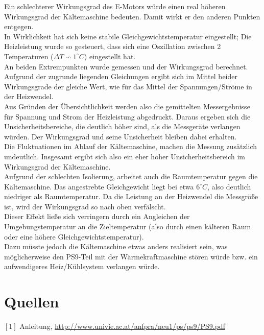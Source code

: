 \documentclass[12pt,a4paper]{article}
\begin{document}
\begin{multicols}{2}
\noindent Ein schlechterer Wirkungsgrad des E-Motors würde einen real höheren Wirkungsgrad der Kältemaschine bedeuten. Damit wirkt er den anderen Punkten entgegen.\\
In Wirklichkeit hat sich keine stabile Gleichgewichtstemperatur eingestellt; Die Heizleistung wurde so gesteuert, dass sich eine Oszillation zwischen 2 Temperaturen ($\Delta T \backsim 1^\circ C$) eingestellt hat.\\
An beiden Extrempunkten wurde gemessen und der Wirkungsgrad berechnet. Aufgrund der zugrunde liegenden Gleichungen ergibt sich im Mittel beider Wirkungsgrade der gleiche Wert, wie für das Mittel der Spannungen/Ströme in der Heizwendel.\\
Aus Gründen der Übersichtlichkeit werden also die gemittelten Messergebnisse für Spannung und Strom der Heizleistung abgedruckt. Daraus ergeben sich die Unsicherheitsbereiche, die deutlich höher sind, als die Messgeräte verlangen würden.
Der Wirkungsgrad und seine Unsicherheit bleiben dabei erhalten.\\
Die Fluktuationen im Ablauf der Kältemaschine, machen die Messung zusätzlich undeutlich. Insgesamt ergibt sich also ein eher hoher Unsicherheitsbereich im Wirkungsgrad der Kältemaschine.\\

\noindent Aufgrund der schlechten Isolierung, arbeitet auch die Raumtemperatur gegen die Kältemaschine. Das angestrebte Gleichgewicht liegt bei etwa $6^\circ C$, also deutlich niedriger als Raumtemperatur. Da die Leistung an der Heizwendel die Messgröße ist, wird der Wirkungsgrad so nach oben verfälscht.\\
Dieser Effekt ließe sich verringern durch ein Angleichen der Umgebungstemperatur an die Zieltemperatur (also durch einen kälteren Raum oder eine höhere Gleichgewichtstemperatur).\\
Dazu müsste jedoch die Kältemaschine etwas anders realisiert sein, was möglicherweise den PS9-Teil mit der Wärmekraftmaschine stören würde bzw. ein aufwendigeres Heiz/Kühlsystem verlangen würde.\\







\section{Quellen}
$[1]$ Anleitung, \url{http://www.univie.ac.at/anfpra/neu1/ps/ps9/PS9.pdf}\\

\end{multicols}
\end{document}
